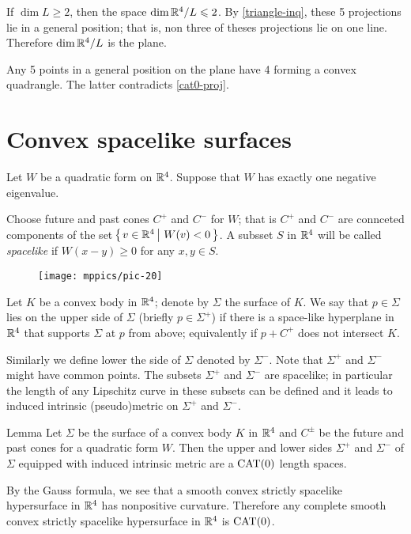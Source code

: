 \documentclass{article}
\begin{document}
If $\dim L\ge 2$, then the space $\mathop{\rm dim}\nolimits \mathbb{R}^4/L\leqslant 2$.
By \ref{triangle-inq}, these 5 projections lie in a general position; that is, non three of theses projections lie on one line. 
Therefore $\mathop{\rm dim}\nolimits \mathbb{R}^4/L$ is the plane.

Any 5 points in a general position on the plane have 4 forming a convex quadrangle.
The latter contradicts \ref{cat0-proj}.
\qeds

\section{Convex spacelike surfaces}

Let $W$ be a quadratic form on $\mathbb{R}^4$.
Suppose that  $W$ has exactly one negative eigenvalue.

Choose future and past cones $C^+$ and $C^-$ for $W$;
that is $C^+$ and $C^-$ are connceted components of the set
$\set{v\in\RR^4}{W(v)< 0}$.
A subsset $S$ in $\mathbb{R}^4$ will be called \emph{spacelike} if $W(x-y)\ge 0$ for any $x,y\in S$.

\begin{wrapfigure}{r}{60mm}
\vskip-4mm
\centering
\texttt{[image: mppics/pic-20]}
\end{wrapfigure}

Let $K$ be a convex body in $\mathbb{R}^4$;
denote by $\Sigma$ the surface of $K$. 
We say that $p\in \Sigma$ lies on the upper side of $\Sigma$ (briefly $p\in\Sigma^+$) if there is a space-like hyperplane in $\mathbb{R}^4$ that supports $\Sigma$ at $p$ from above;
equivalently if $p+C^+$ does not intersect $K$.

Similarly we define lower the side of $\Sigma$ denoted by $\Sigma^-$.
Note that $\Sigma^+$ and $\Sigma^-$ might have common points.
The subsets $\Sigma^+$ and $\Sigma^-$ are spacelike;
in particular the length of any Lipschitz curve in these subsets can be defined and it leads to induced intrinsic (pseudo)metric on $\Sigma^+$ and $\Sigma^-$. 

\begin{thm}{Lemma}\label{lem:sides}
Let $\Sigma$ be the surface of a convex body $K$ in $\mathbb{R}^4$ and $C^\pm$ be the future and past cones for a quadratic form $W$.
Then the upper and lower sides $\Sigma^+$ and $\Sigma^-$ of $\Sigma$ equipped with induced intrinsic metric are a $\mathrm{CAT}(0)$ length spaces. 
\end{thm}

By the Gauss formula, we see that a smooth convex strictly spacelike hypersurface in $\mathbb{R}^4$ has nonpositive curvature.
Therefore any complete smooth convex strictly spacelike hypersurface in $\mathbb{R}^4$ is $\mathrm{CAT}(0)$.
\end{document}
